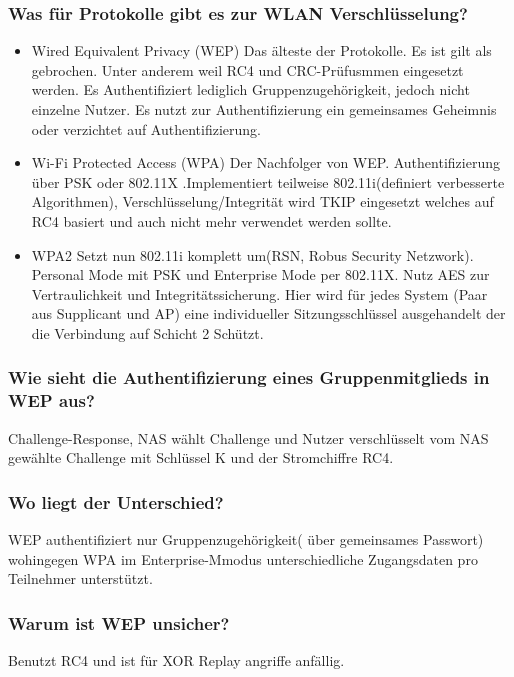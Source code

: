 		\subsubsection{Was für Protokolle gibt es zur WLAN Verschlüsselung?}
	\begin{itemize}
	\item Wired Equivalent Privacy (WEP) Das älteste der Protokolle. Es ist gilt als gebrochen. Unter anderem weil RC4 und CRC-Prüfusmmen eingesetzt werden. Es Authentifiziert lediglich Gruppenzugehörigkeit, jedoch nicht einzelne Nutzer. Es nutzt zur Authentifizierung ein gemeinsames Geheimnis oder verzichtet auf Authentifizierung.
	\item Wi-Fi Protected Access (WPA) Der Nachfolger von WEP. Authentifizierung über PSK oder 802.11X .Implementiert teilweise 802.11i(definiert verbesserte Algorithmen), Verschlüsselung/Integrität wird TKIP eingesetzt welches auf RC4 basiert und auch nicht mehr verwendet werden sollte.
	\item{WPA2} Setzt nun 802.11i komplett um(RSN, Robus Security Netzwork). Personal Mode mit PSK und Enterprise Mode per 802.11X. Nutz AES zur Vertraulichkeit und Integritätssicherung.  Hier wird für jedes System (Paar aus Supplicant und AP) eine individueller Sitzungsschlüssel ausgehandelt der die Verbindung auf Schicht 2 Schützt.
\end{itemize}	

	\subsubsection{Wie sieht die Authentifizierung eines Gruppenmitglieds in WEP aus?}
	Challenge-Response, NAS wählt Challenge und Nutzer verschlüsselt vom NAS gewählte Challenge mit Schlüssel K und der Stromchiffre RC4.	
	
	
	\subsubsection{Wo liegt der Unterschied?}
	WEP authentifiziert nur Gruppenzugehörigkeit( über gemeinsames Passwort) wohingegen WPA im Enterprise-Mmodus unterschiedliche Zugangsdaten pro Teilnehmer unterstützt.
	
	\subsubsection{Warum ist WEP unsicher?}
	Benutzt RC4  und ist für XOR Replay angriffe anfällig. %
	
